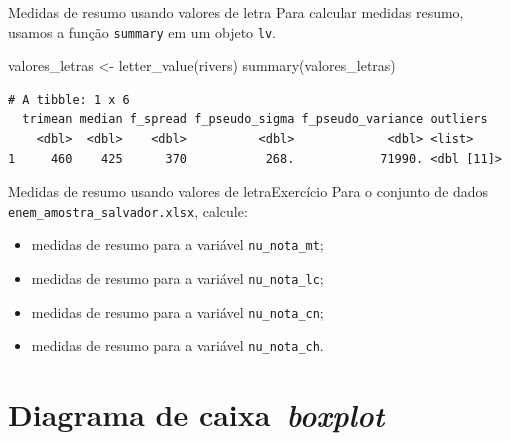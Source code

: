 \documentclass[
  10pt,
  ignorenonframetext,
]{beamer}
\newenvironment{Shaded}{\begin{snugshade}}{\end{snugshade}}
\newcommand{\FunctionTok}[1]{\textcolor[rgb]{0.28,0.35,0.67}{#1}}
\newcommand{\NormalTok}[1]{\textcolor[rgb]{0.00,0.23,0.31}{#1}}
\newcommand{\OtherTok}[1]{\textcolor[rgb]{0.00,0.23,0.31}{#1}}
\providecommand{\tightlist}{%
  \setlength{\itemsep}{0pt}\setlength{\parskip}{0pt}}\usepackage{longtable,booktabs,array}
\begin{document}
\begin{frame}[fragile]{Medidas de resumo usando valores de letra}
\protect\hypertarget{medidas-de-resumo-usando-valores-de-letra-1}{}
Para calcular medidas resumo, usamos a função \texttt{summary} em um
objeto \texttt{lv}.

\small

\begin{Shaded}
\begin{Highlighting}[]
\NormalTok{valores\_letras }\OtherTok{\textless{}{-}} \FunctionTok{letter\_value}\NormalTok{(rivers)}
\FunctionTok{summary}\NormalTok{(valores\_letras)}
\end{Highlighting}
\end{Shaded}

\begin{verbatim}
# A tibble: 1 x 6
  trimean median f_spread f_pseudo_sigma f_pseudo_variance outliers  
    <dbl>  <dbl>    <dbl>          <dbl>             <dbl> <list>    
1     460    425      370           268.            71990. <dbl [11]>
\end{verbatim}

\normalsize
\end{frame}

\begin{frame}[fragile]{Medidas de resumo usando valores de
letra\newline Exercício}
\protect\hypertarget{medidas-de-resumo-usando-valores-de-letraexercuxedcio}{}
Para o conjunto de dados \texttt{enem\_amostra\_salvador.xlsx}, calcule:

\begin{itemize}
\tightlist
\item
  medidas de resumo para a variável \texttt{nu\_nota\_mt};
\item
  medidas de resumo para a variável \texttt{nu\_nota\_lc};
\item
  medidas de resumo para a variável \texttt{nu\_nota\_cn};
\item
  medidas de resumo para a variável \texttt{nu\_nota\_ch}.
\end{itemize}
\end{frame}

\hypertarget{diagrama-de-caixa-boxplot}{%
\section{\texorpdfstring{Diagrama de
caixa\newline\newline~\emph{boxplot}}{Diagrama de caixa~boxplot}}\label{diagrama-de-caixa-boxplot}}
\end{document}
